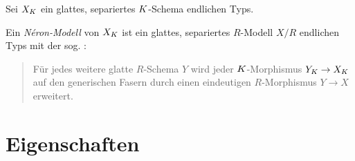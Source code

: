 \documentclass[german]{scrreprt}
\begin{document}
\begin{Definition}
  Sei $X_{K}$ ein glattes, separiertes $K$-Schema endlichen Typs.

  Ein \emph{Néron-Modell} von $X_{K}$ ist ein glattes, separiertes
  $R$-Modell $X/R$ endlichen Typs mit der
  sog. \NAbbEig:
  \begin{quote}
    Für jedes weitere glatte $R$-Schema $Y$ wird jeder
    $K$-Morphismus $Y_{K}\to X_{K}$ auf den generischen Fasern durch
    einen eindeutigen $R$-Morphismus $Y\to X$ erweitert.
  \end{quote}
  \cite[1.2, Definition 1]{neron}
\end{Definition}


\section{Eigenschaften}
\end{document}
